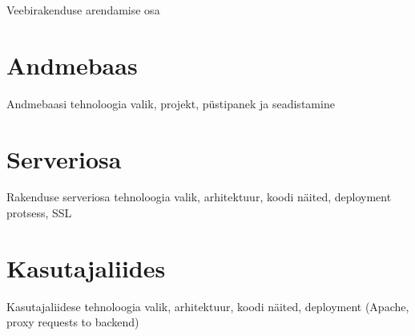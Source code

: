 Veebirakenduse arendamise osa

\section{Andmebaas}
Andmebaasi tehnoloogia valik, projekt, püstipanek ja seadistamine
\section{Serveriosa}
Rakenduse serveriosa tehnoloogia valik, arhitektuur, koodi näited, deployment protsess, SSL
\section{Kasutajaliides}
Kasutajaliidese tehnoloogia valik, arhitektuur, koodi näited, deployment (Apache, proxy requests to backend)
